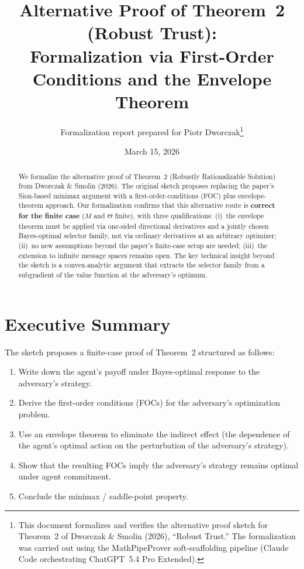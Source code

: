 \documentclass[12pt]{article}
\title{Alternative Proof of Theorem~2 (Robust Trust):\\
Formalization via First-Order Conditions and the Envelope Theorem}
\author{Formalization report prepared for Piotr Dworczak\thanks{%
This document formalizes and verifies the alternative proof sketch
for Theorem~2 of Dworczak \& Smolin (2026), ``Robust Trust.''
The formalization was carried out using the MathPipeProver
soft-scaffolding pipeline (Claude Code orchestrating ChatGPT~5.4 Pro Extended).}}
\date{March 15, 2026}
\begin{document}
\maketitle

\begin{abstract}
We formalize the alternative proof of Theorem~2 (Robustly Rationalizable Solution) from Dworczak \& Smolin (2026). The original sketch proposes replacing the paper's Sion-based minimax argument with a first-order-conditions (FOC) plus envelope-theorem approach.
Our formalization confirms that this alternative route is \textbf{correct for the finite case} ($M$ and $\Theta$ finite), with three qualifications:
(i)~the envelope theorem must be applied via one-sided directional derivatives and a jointly chosen Bayes-optimal selector family, not via ordinary derivatives at an arbitrary optimizer;
(ii)~no new assumptions beyond the paper's finite-case setup are needed;
(iii)~the extension to infinite message spaces remains open.
The key technical insight beyond the sketch is a convex-analytic argument that extracts the selector family from a subgradient of the value function at the adversary's optimum.
\end{abstract}

\tableofcontents

\section{Executive Summary}

The sketch proposes a finite-case proof of Theorem~2 structured as follows:
\begin{enumerate}
\item Write down the agent's payoff under Bayes-optimal response to the adversary's strategy.
\item Derive the first-order conditions (FOCs) for the adversary's optimization problem.
\item Use an envelope theorem to eliminate the indirect effect (the dependence of the agent's optimal action on the perturbation of the adversary's strategy).
\item Show that the resulting FOCs imply the adversary's strategy remains optimal under agent commitment.
\item Conclude the minimax / saddle-point property.
\end{enumerate}
\end{document}
